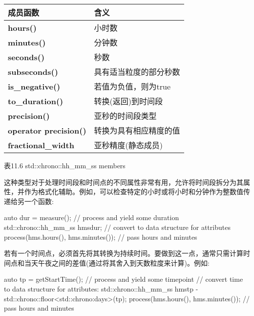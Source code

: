 \begin{longtable}[c]{|l|l|}
\hline
\textbf{成员函数}               & \textbf{含义}                                       \\ \hline
\endfirsthead
%
\endhead
%
\textbf{hours()}              & 小时数                                            \\ \hline
\textbf{minutes()}            & 分钟数                                          \\ \hline
\textbf{seconds()}            & 秒数                                          \\ \hline
\textbf{subseconds()}         & 具有适当粒度的部分秒数 \\ \hline
\textbf{is\_negative()}       & 若值为负值，则为true                          \\ \hline
\textbf{to\_duration()}       & 转换(返回)到时间段                         \\ \hline
\textbf{precision()}          & 亚秒的时间段类型                        \\ \hline
\textbf{operator precision()} & 转换为具有相应精度的值       \\ \hline
\textbf{fractional\_width}    & 亚秒精度(静态成员)            \\ \hline
\end{longtable}

\begin{center}
表11.6 std::chrono::hh\_mm\_ss members
\end{center}

这种类型对于处理时间段和时间点的不同属性非常有用，允许将时间段拆分为其属性，并作为格式化辅助。例如，可以检查特定的小时或将小时和分钟作为整数值传递给另一个函数:

\begin{cpp}
auto dur = measure(); // process and yield some duration
std::chrono::hh_mm_ss hms{dur}; // convert to data structure for attributes
process(hms.hours(), hms.minutes()); // pass hours and minutes
\end{cpp}

若有一个时间点，必须首先将其转换为持续时间。要做到这一点，通常只需计算时间点和当天午夜之间的差值(通过将其舍入到天数粒度来计算)。例如:

\begin{cpp}
auto tp = getStartTime(); // process and yield some timepoint
// convert time to data structure for attributes:
std::chrono::hh_mm_ss hms{tp - std::chrono::floor<std::chrono:days>(tp)};
process(hms.hours(), hms.minutes()); // pass hours and minutes
\end{cpp}

